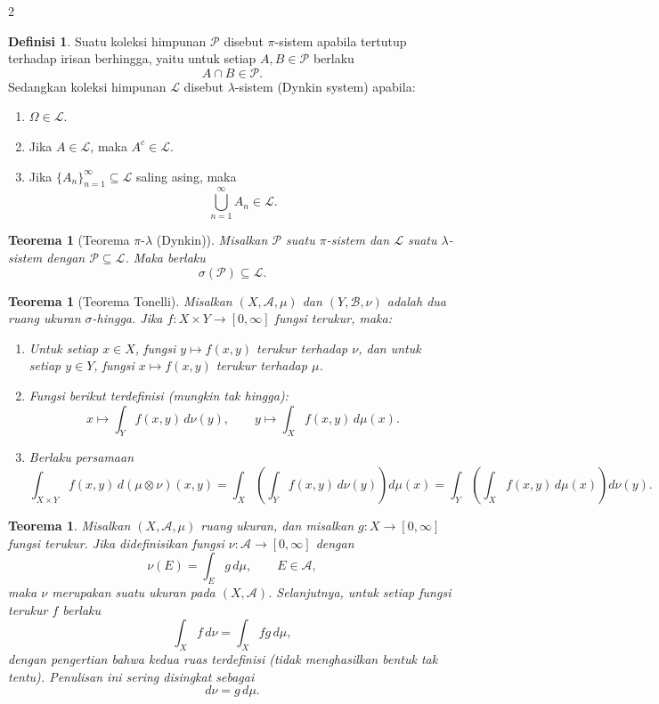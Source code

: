 \documentclass[a4paper,extrafontsizes, 9pt]{memoir}
\theoremstyle{definition}
\newtheorem{definisi}[kalstok]{Definisi}
\theoremstyle{plain}
\newtheorem{teorema}[kalstok]{Teorema}
\theoremstyle{remark}
\begin{document}
\begin{multicols}{2}
  \begin{definisi}
    Suatu koleksi himpunan $\mathcal{P}$ disebut $\pi$-sistem apabila tertutup terhadap irisan berhingga,
    yaitu untuk setiap $A,B\in\mathcal{P}$ berlaku
    \[A\cap B\in\mathcal{P}.\]
    Sedangkan koleksi himpunan $\mathcal{L}$ disebut $\lambda$-sistem (Dynkin system) apabila:
    \begin{enumerate}[leftmargin=*, itemsep=0.5mm]
      \item $\Omega\in\mathcal{L}$.
      \item Jika $A\in\mathcal{L}$, maka $A^c\in\mathcal{L}$.
      \item Jika $\{A_n\}_{n=1}^{\infty}\subseteq\mathcal{L}$ saling asing, maka
            \[\bigcup_{n=1}^{\infty}A_n\in\mathcal{L}.\]
    \end{enumerate}
  \end{definisi}

  \begin{teorema}[Teorema $\pi$-$\lambda$ (Dynkin)]
    Misalkan $\mathcal{P}$ suatu $\pi$-sistem dan $\mathcal{L}$ suatu $\lambda$-sistem dengan
    $\mathcal{P}\subseteq\mathcal{L}$. Maka berlaku
    \[\sigma(\mathcal{P})\subseteq\mathcal{L}.\]
  \end{teorema}

  \begin{teorema}[Teorema Tonelli]
    Misalkan $(X,\mathcal{A},\mu)$ dan $(Y,\mathcal{B},\nu)$ adalah dua ruang ukuran
    $\sigma$-hingga. Jika $f:X\times Y\to[0,\infty]$ fungsi terukur, maka:
    \begin{enumerate}[leftmargin=*, itemsep=0.5mm]
      \item Untuk setiap $x\in X$, fungsi $y\mapsto f(x,y)$ terukur terhadap $\nu$, dan untuk setiap
            $y\in Y$, fungsi $x\mapsto f(x,y)$ terukur terhadap $\mu$.
      \item Fungsi berikut terdefinisi (mungkin tak hingga):
            \[x\mapsto\int_Y f(x,y)\,d\nu(y),\qquad y\mapsto\int_X f(x,y)\,d\mu(x).\]
      \item Berlaku persamaan
            \[\int_{X\times Y} f(x,y)\,d(\mu\otimes\nu)(x,y)
              =\int_X\left(\int_Y f(x,y)\,d\nu(y)\right)d\mu(x)
              =\int_Y\left(\int_X f(x,y)\,d\mu(x)\right)d\nu(y).\]
    \end{enumerate}
  \end{teorema}

  \begin{teorema}
    Misalkan $(X,\mathcal{A},\mu)$ ruang ukuran, dan misalkan $g:X\to[0,\infty]$ fungsi terukur.
    Jika didefinisikan fungsi $\nu:\mathcal{A}\to[0,\infty]$ dengan
    \[\nu(E)=\int_E g\,d\mu,\qquad E\in\mathcal{A},\]
    maka $\nu$ merupakan suatu ukuran pada $(X,\mathcal{A})$. Selanjutnya, untuk setiap fungsi terukur
    $f$ berlaku
    \[\int_X f\,d\nu=\int_X fg\,d\mu,\]
    dengan pengertian bahwa kedua ruas terdefinisi (tidak menghasilkan bentuk tak tentu).
    Penulisan ini sering disingkat sebagai
    \[d\nu=g\,d\mu.\]
  \end{teorema}


\end{multicols}
\end{document}
